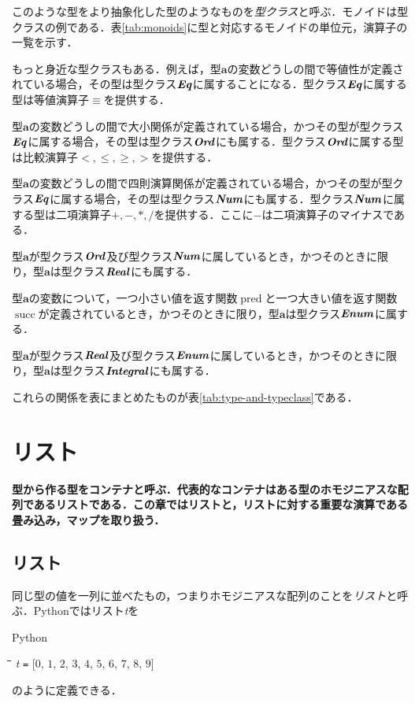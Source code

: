 \documentclass[twocolumn]{jsbook}
\newcommand{\programminglanguage}[1]{\textsf{#1}}
\newcommand{\python}{\programminglanguage{Python}}
\newcommand{\keyword}[1]{{\emph{#1}}}
\newenvironment{pythoncode}{\begin{itembox}[r]{\python}}{\end{itembox}}
\newenvironment{pythontab}{\begin{tabbing}\hspace*{1em}\=\hspace*{1em}\=\hspace*{1em}\=\hspace*{1em}\=\kill}{\end{tabbing}}
\newenvironment{leader}{\begingroup\bf}{\endgroup}
\newcommand{\pthnId}[1]{\textit{#1}}
\newcommand{\pthnOp}[1]{\texttt{#1}}
\newcommand{\hsklType}[1]{\textbf{#1}}
\newcommand{\hsklTypeClass}[1]{\textbf{\emph{#1}}}
\DeclareMathOperator{\hsklPred}{pred}
\DeclareMathOperator{\hsklSucc}{succ}
\newcommand{\hsklEnum}{\hsklTypeClass{Enum}}
\newcommand{\hsklIntegral}{\hsklTypeClass{Integral}}
\newcommand{\hsklEq}{\hsklTypeClass{Eq}}
\newcommand{\hsklNum}{\hsklTypeClass{Num}}
\newcommand{\hsklOrd}{\hsklTypeClass{Ord}}
\newcommand{\hsklReal}{\hsklTypeClass{Real}}
\begin{document}
このような型をより抽象化した型のようなものを\keyword{型クラス}と呼ぶ．モノイドは型クラスの例である．表\ref{tab:monoids}に型と対応するモノイドの単位元，演算子の一覧を示す．

もっと身近な型クラスもある．例えば，型$\hsklType{a}$の変数どうしの間で等値性が定義されている場合，その型は型クラス$\hsklEq$に属することになる．型クラス$\hsklEq$に属する型は等値演算子$\equiv$を提供する．

型$\hsklType{a}$の変数どうしの間で大小関係が定義されている場合，かつその型が型クラス$\hsklEq$に属する場合，その型は型クラス$\hsklOrd$にも属する．型クラス$\hsklOrd$に属する型は比較演算子$<,\le,\ge,>$を提供する．

型$\hsklType{a}$の変数どうしの間で四則演算関係が定義されている場合，かつその型が型クラス$\hsklEq$に属する場合，その型は型クラス$\hsklNum$にも属する．型クラス$\hsklNum$に属する型は二項演算子$+,-,*,/$を提供する．ここに$-$は二項演算子のマイナスである．

型$\hsklType{a}$が型クラス$\hsklOrd$及び型クラス$\hsklNum$に属しているとき，かつそのときに限り，型$\hsklType{a}$は型クラス$\hsklReal$にも属する．

型$\hsklType{a}$の変数について，一つ小さい値を返す関数$\hsklPred$と一つ大きい値を返す関数$\hsklSucc$が定義されているとき，かつそのときに限り，型$\hsklType{a}$は型クラス$\hsklEnum$に属する．

型$\hsklType{a}$が型クラス$\hsklReal$及び型クラス$\hsklEnum$に属しているとき，かつそのときに限り，型$\hsklType{a}$は型クラス$\hsklIntegral$にも属する．

これらの関係を表にまとめたものが表\ref{tab:type-and-typeclass}である．

\chapter{リスト}
\begin{leader}
型から作る型をコンテナと呼ぶ．代表的なコンテナはある型のホモジニアスな配列であるリストである．この章ではリストと，リストに対する重要な演算である畳み込み，マップを取り扱う．
\end{leader}


\section{リスト}

同じ型の値を一列に並べたもの，つまりホモジニアスな配列のことを\keyword{リスト}と呼ぶ．\python ではリスト\pthnId{t}を
\begin{pythoncode}
\begin{pythontab}
\pthnId{t} \pthnOp{=} [$0$, $1$, $2$, $3$, $4$, $5$, $6$, $7$, $8$, $9$]
\end{pythontab}
\end{pythoncode}
のように定義できる．
\end{document}
